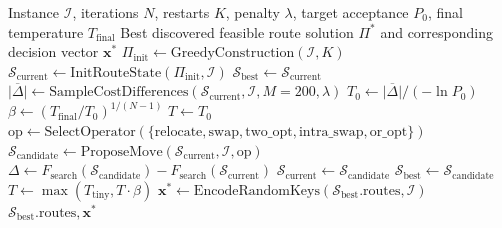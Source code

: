 \begin{algorithm}[htbp]
\caption{Simulated Annealing for Heterogeneous UAV--UGV Task Allocation and Routing}
\label{alg:sa}
\begin{algorithmic}[1]
\REQUIRE Instance $\mathcal{I}$, iterations $N$, restarts $K$, penalty $\lambda$, target acceptance $P_0$, final temperature $T_{\text{final}}$
\ENSURE Best discovered feasible route solution $\Pi^*$ and corresponding decision vector $\mathbf{x}^*$
\STATE $\Pi_{\text{init}} \gets \text{GreedyConstruction}(\mathcal{I}, K)$
\STATE $\mathcal{S}_{\text{current}} \gets \text{InitRouteState}(\Pi_{\text{init}}, \mathcal{I})$
\STATE $\mathcal{S}_{\text{best}} \gets \mathcal{S}_{\text{current}}$
\STATE $\overline{|\Delta|} \gets \text{SampleCostDifferences}(\mathcal{S}_{\text{current}}, \mathcal{I}, M=200, \lambda)$
\STATE $T_0 \gets \overline{|\Delta|} / (-\ln P_0)$
\STATE $\beta \gets (T_{\text{final}} / T_0)^{1 / (N - 1)}$
\STATE $T \gets T_0$
    \STATE $\text{op} \gets \text{SelectOperator}(\{\text{relocate}, \text{swap}, \text{two\_opt}, \text{intra\_swap}, \text{or\_opt}\})$
    \STATE $\mathcal{S}_{\text{candidate}} \gets \text{ProposeMove}(\mathcal{S}_{\text{current}}, \mathcal{I}, \text{op})$ 
        \STATE $\Delta \gets F_{\text{search}}(\mathcal{S}_{\text{candidate}}) - F_{\text{search}}(\mathcal{S}_{\text{current}})$
            \STATE $\mathcal{S}_{\text{current}} \gets \mathcal{S}_{\text{candidate}}$
        \ENDIF
            \STATE $\mathcal{S}_{\text{best}} \gets \mathcal{S}_{\text{candidate}}$ 
        \ENDIF
    \ENDIF
    \STATE $T \gets \max(T_{\text{tiny}}, T \cdot \beta)$
\ENDFOR
\STATE $\mathbf{x}^* \gets \text{EncodeRandomKeys}(\mathcal{S}_{\text{best}}.\text{routes}, \mathcal{I})$
\RETURN $\mathcal{S}_{\text{best}}.\text{routes}, \mathbf{x}^*$
\end{algorithmic}
\end{algorithm}